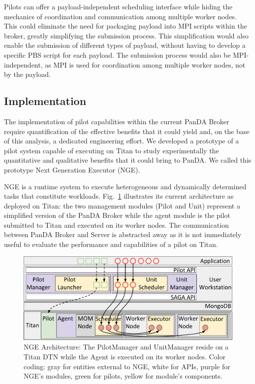 Pilots can offer a payload-independent scheduling interface while hiding the
mechanics of coordination and communication among multiple worker nodes. This
could eliminate the need for packaging payload into MPI scripts within the
broker, greatly simplifying the submission process. This simplification would
also enable the submission of different types of payload, without having to
develop a specific PBS script for each payload. The submission process would
also be MPI-independent, as MPI is used for coordination among multiple
worker nodes, not by the payload.

\subsection{Implementation}
\label{sec:arch}

The implementation of pilot capabilities within the current PanDA Broker require
quantification of the effective benefits that it could yield and, on the base of
this analysis, a dedicated engineering effort. We developed a prototype of a
pilot system capable of executing on Titan to study experimentally the
quantitative and qualitative benefits that it could bring to PanDA. We called
this prototype Next Generation Executor (NGE).

NGE is a runtime system to execute heterogeneous and dynamically determined
tasks that constitute workloads. Fig.~\ref{fig:arch-overview} illustrates its
current architecture as deployed on Titan: the two management modules (Pilot
and Unit) represent a simplified version of the PanDA Broker while the agent
module is the pilot submitted to Titan and executed on its worker nodes. The
communication between PanDA Broker and Server is abstracted away as it
is not immediately useful to evaluate the performance and capabilities of a
pilot on Titan.

\begin{figure}
  \centering
   \includegraphics[width=\columnwidth]{figures/rp_architecture_compact_atlaswms_paper.pdf}
   \vspace{-0.3in}
  \caption{NGE Architecture: The PilotManager and  UnitManager reside on a Titan
  DTN while the Agent is executed on its worker nodes. Color coding: gray for
  entities external to NGE, white for APIs, purple for NGE's modules, green for
  pilots, yellow for module's components.}
\label{fig:arch-overview}
\end{figure}

